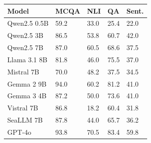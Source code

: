 \begin{tabular}{lllll}
\toprule
       Model & MCQA &  NLI &   QA & Sent. \\
\midrule
Qwen2.5 0.5B & 59.2 & 33.0 & 25.4 &  22.0 \\
  Qwen2.5 3B & 86.5 & 53.8 & 60.7 &  42.0 \\
  Qwen2.5 7B & 87.0 & 60.5 & 68.6 &  37.5 \\
Llama 3.1 8B & 81.8 & 46.0 & 75.5 &  37.0 \\
  Mistral 7B & 70.0 & 48.2 & 37.5 &  34.5 \\
  Gemma 2 9B & 94.0 & 60.2 & 81.2 &  41.0 \\
  Gemma 3 4B & 87.2 & 50.0 & 73.6 &  41.0 \\
  Vistral 7B & 86.8 & 18.2 & 60.4 &  31.8 \\
   SeaLLM 7B & 87.8 & 44.0 & 65.7 &  36.2 \\
      GPT-4o & 93.8 & 70.5 & 83.4 &  59.8 \\
\bottomrule
\end{tabular}
